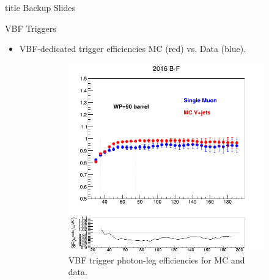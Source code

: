 \documentclass[9pt,aspectratio=1610]{beamer}
\begin{document}
\begin{frame}
	\vfill
	\centering
	\begin{beamercolorbox}[sep=8pt,center,shadow=false,rounded=true]{title}
		\Huge Backup Slides \par%
	\end{beamercolorbox}
	\vfill
\end{frame}

\begin{frame}{VBF Triggers}
	\begin{itemize}
		\item VBF-dedicated trigger efficiencies MC (red) vs. Data (blue).\\
		\vspace{1em}	
		\begin{figure}
			\centering
			\begin{subfigure}[t]{0.31\linewidth}
				\includegraphics[width=\textwidth]{figures/misc/PhotonFromData_RhoCat12016_WP90_barrel.png}
				\caption{VBF trigger photon-leg efficiencies for MC and data.}
			\end{subfigure}%
			\hfill
			\begin{subfigure}[t]{0.31\linewidth}

\end{subfigure}
\end{figure}
\end{itemize}
\end{frame}
\end{document}
